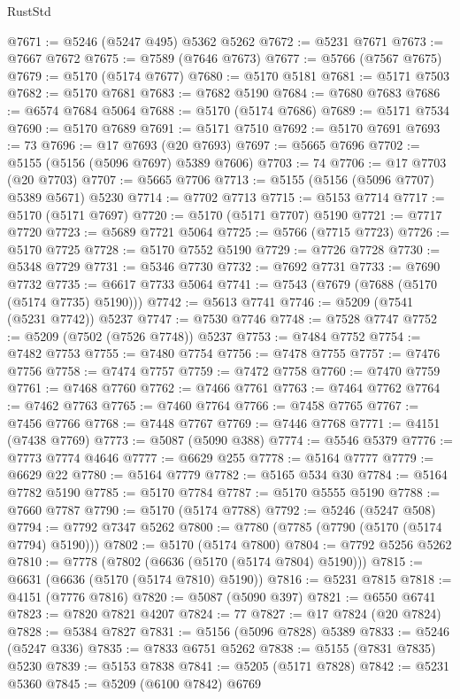 \begin{lexlean}{RustStd}
\begin{coremodule}
@7671 := @5246 (@5247 @495) @5362 @5262
@7672 := @5231 @7671
@7673 := @7667 @7672
@7675 := @7589 (@7646 @7673)
@7677 := @5766 (@7567 @7675)
@7679 := @5170 (@5174 @7677)
@7680 := @5170 @5181
@7681 := @5171 @7503
@7682 := @5170 @7681
@7683 := @7682 @5190
@7684 := @7680 @7683
@7686 := @6574 @7684 @5064
@7688 := @5170 (@5174 @7686)
@7689 := @5171 @7534
@7690 := @5170 @7689
@7691 := @5171 @7510
@7692 := @5170 @7691
@7693 := 73
@7696 := @17 @7693 (@20 @7693)
@7697 := @5665 @7696
@7702 := @5155 (@5156 (@5096 @7697) @5389 @7606)
@7703 := 74
@7706 := @17 @7703 (@20 @7703)
@7707 := @5665 @7706
@7713 := @5155 (@5156 (@5096 @7707) @5389 @5671) @5230
@7714 := @7702 @7713
@7715 := @5153 @7714
@7717 := @5170 (@5171 @7697)
@7720 := @5170 (@5171 @7707) @5190
@7721 := @7717 @7720
@7723 := @5689 @7721 @5064
@7725 := @5766 (@7715 @7723)
@7726 := @5170 @7725
@7728 := @5170 @7552 @5190
@7729 := @7726 @7728
@7730 := @5348 @7729
@7731 := @5346 @7730
@7732 := @7692 @7731
@7733 := @7690 @7732
@7735 := @6617 @7733 @5064
@7741 := @7543 (@7679 (@7688 (@5170 (@5174 @7735) @5190)))
@7742 := @5613 @7741
@7746 := @5209 (@7541 (@5231 @7742)) @5237
@7747 := @7530 @7746
@7748 := @7528 @7747
@7752 := @5209 (@7502 (@7526 @7748)) @5237
@7753 := @7484 @7752
@7754 := @7482 @7753
@7755 := @7480 @7754
@7756 := @7478 @7755
@7757 := @7476 @7756
@7758 := @7474 @7757
@7759 := @7472 @7758
@7760 := @7470 @7759
@7761 := @7468 @7760
@7762 := @7466 @7761
@7763 := @7464 @7762
@7764 := @7462 @7763
@7765 := @7460 @7764
@7766 := @7458 @7765
@7767 := @7456 @7766
@7768 := @7448 @7767
@7769 := @7446 @7768
@7771 := @4151 (@7438 @7769)
@7773 := @5087 (@5090 @388)
@7774 := @5546 @5379
@7776 := @7773 @7774 @4646
@7777 := @6629 @255
@7778 := @5164 @7777
@7779 := @6629 @22
@7780 := @5164 @7779
@7782 := @5165 @534 @30
@7784 := @5164 @7782 @5190
@7785 := @5170 @7784
@7787 := @5170 @5555 @5190
@7788 := @7660 @7787
@7790 := @5170 (@5174 @7788)
@7792 := @5246 (@5247 @508)
@7794 := @7792 @7347 @5262
@7800 := @7780 (@7785 (@7790 (@5170 (@5174 @7794) @5190)))
@7802 := @5170 (@5174 @7800)
@7804 := @7792 @5256 @5262
@7810 := @7778 (@7802 (@6636 (@5170 (@5174 @7804) @5190)))
@7815 := @6631 (@6636 (@5170 (@5174 @7810) @5190))
@7816 := @5231 @7815
@7818 := @4151 (@7776 @7816)
@7820 := @5087 (@5090 @397)
@7821 := @6550 @6741
@7823 := @7820 @7821 @4207
@7824 := 77
@7827 := @17 @7824 (@20 @7824)
@7828 := @5384 @7827
@7831 := @5156 (@5096 @7828) @5389
@7833 := @5246 (@5247 @336)
@7835 := @7833 @6751 @5262
@7838 := @5155 (@7831 @7835) @5230
@7839 := @5153 @7838
@7841 := @5205 (@5171 @7828)
@7842 := @5231 @5360
@7845 := @5209 (@6100 @7842) @6769

\end{coremodule}
\end{lexlean}

